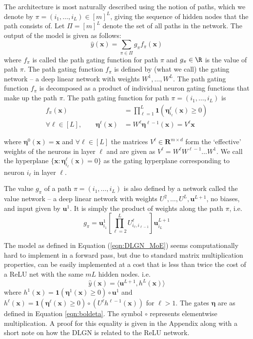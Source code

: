 \documentclass{article} %
\renewcommand{\>}{{\rightarrow}}
\renewcommand{\=}{\stackrel{\triangle}{=}}
\newcommand{\0}{{\mathbf 0}}
\newcommand{\h}{{h}}%
\newcommand{\x}{{\mathbf x}}
\newcommand{\bu}{{\mathbf u}}
\newcommand{\boldeta}{{\boldsymbol \eta}}
\begin{document}
The architecture is most naturally described using the notion of paths, which we denote by $\pi = (i_1, \ldots, i_L) \in [m]^L$, giving the sequence of hidden nodes that the path consists of. Let $\Pi = [m]^L$ denote the set of all paths in the network. The output of the model is given as follows:
\begin{equation}
\widehat y(\x) = \sum_{\pi \in \Pi} g_\pi f_\pi(\x)     \label{eqn:DLGN_MoE}
\end{equation}
where $f_\pi$ is called the path gating function for path $\pi$ and $g_\pi \in \R$ is the value of path $\pi$. The path gating function $f_\pi$ is defined by (what we call) the gating network -- a deep linear network with weights $W^1, \ldots, W^L$. The path gating function $f_\pi$ is decomposed as a product of individual neuron gating functions that make up the path $\pi$. The path gating function for path $\pi = (i_1, \ldots, i_L)$ is 
\begin{align}
    f_\pi(\x) &= \prod_{\ell = 1}^{L} \mathbf{1}\left(\boldeta^\ell_{i_\ell}(\x) \geq 0 \right) \\
    \forall \ell \in [L],  \qquad \boldeta^\ell (\x) &= W^\ell \boldeta^{\ell-1}(\x)   = V^\ell \x        \label{eqn:boldeta}
 \end{align}
 
where $\boldeta^0(\x) =  \x$ and $\forall \ell \in [L]$ the matrices $V^\ell \in \mathbf{R}^{m \times d}$ form the `effective' weights of the neurons in layer $\ell$ and are given as $V^\ell = W^\ell W^{\ell-1} \ldots W^1$. We call the hyperplane $\{\x:\boldeta^\ell_{i_\ell}(\x)=0\}$ as the gating hyperplane corresponding to neuron $i_\ell$ in layer $\ell$.

The value $g_\pi$ of a path $\pi = (i_1, \ldots, i_L)$ is also defined by a network called the value network -- a deep linear network with weights $U^2, \ldots, U^L, \bu^{L+1}$, no biases, and input given by $\bu^1$. It is simply the product of weights along the path $\pi$, i.e. 
\begin{equation}
g_\pi = \bu^1_{i_1} \left[ \prod_{\ell=2}^L U^\ell_{i_{\ell}, i_{\ell-1}} \right] \bu^{L+1}_{i_L}
\label{eqn:g_pi}
\end{equation}

The model as defined in Equation (\ref{eqn:DLGN_MoE}) seems computationally hard to implement in a forward pass, but due to standard matrix multiplication properties, can be easily implemented at a cost that is less than twice the cost of a ReLU net with the same $mL$ hidden nodes. i.e.
\begin{equation}
\widehat y(\x) = \langle \bu^{L+1} , \h^L(\x) \rangle    \label{eqn:DLGN_computation}
\end{equation}
where $\h^1(\x) = \mathbf{1}(\boldeta^1(\x) \geq 0) \circ \bu^1$ and $\h^\ell(\x) = \mathbf{1}(\boldeta^\ell(\x) \geq 0) \circ \left( U^\ell \h^{\ell-1}(\x) \right)$ for $\ell>1$. The gates $\boldeta$ are as defined in Equation  \ref{eqn:boldeta}. The symbol $\circ$ represents elementwise multiplication. A proof for this equality is given in the Appendix along with a short note on how the DLGN is related to the ReLU network. 
\end{document}
